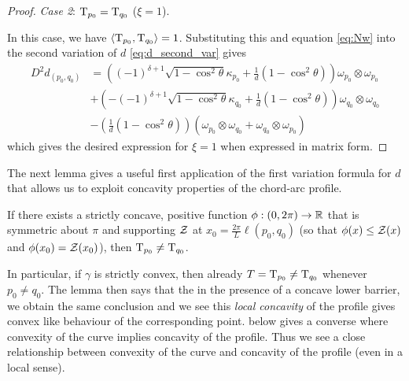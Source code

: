 \documentclass[a4paper, 12pt]{amsart}
\begin{document}
\begin{proof}
\emph{Case 2}: $\operatorname{T}_{p_0} = \operatorname{T}_{q_0}$ ($\xi = 1$).

In this case, we have $\left\langle \operatorname{T}_{p_0},\operatorname{T}_{q_0} \right\rangle = 1$. Substituting this and equation \eqref{eq:Nw} into the second variation of $d$ \eqref{eq:d_second_var} gives
\begin{align*}
D^2d_{(p_0,q_0)} &=  \left((-1)^{\delta+1} \sqrt{1-\cos^2\theta}\kappa_{p_0} + \frac{1}{d}(1 - \cos^2\theta) \right) \omega_{p_0} \otimes \omega_{p_0} \\
&+ \left(-(-1)^{\delta+1} \sqrt{1-\cos^2\theta} \kappa_{q_0} + \frac{1}{d}(1 - \cos^2\theta) \right) \omega_{q_0} \otimes \omega_{q_0} \\
&- \left(\frac{1}{d}(1 - \cos^2\theta) \right) \left(\omega_{p_0} \otimes \omega_{q_0} + \omega_{q_0} \otimes \omega_{p_0} \right)
\end{align*}
which gives the desired expression for $\xi=1$ when expressed in matrix form.

\end{proof}

The next lemma gives a useful first application of the first variation formula for $d$ that allows us to exploit concavity properties of the chord-arc profile. 

\begin{lemma}
\label{lem:concave_barrier}
If there exists a strictly concave, positive function $\phi: (0, 2\pi) \to \mathbb{R}$ that is symmetric about $\pi$ and supporting $\operatorname{\mathcal{Z}}$ at $x_0= \tfrac{2\pi}{L} \ell(p_0,q_0)$ (so that $\phi(x) \leq \operatorname{\mathcal{Z}}(x)$ and $\phi(x_0)=\operatorname{\mathcal{Z}}(x_0)$), then $\operatorname{T}_{p_0} \ne \operatorname{T}_{q_0}$.
\end{lemma}

\begin{rem}
In particular, if $\gamma$ is strictly convex, then already \(T=\operatorname{T}_{p_0} \ne \operatorname{T}_{q_0}\) whenever \(p_0 \ne q_0\). The lemma then says that the in the presence of a concave lower barrier, we obtain the same conclusion and we see this \emph{local concavity} of the profile gives convex like behaviour of the corresponding point.  below gives a converse where convexity of the curve implies concavity of the profile. Thus we see a close relationship between convexity of the curve and concavity of the profile (even in a local sense).
\end{rem}
\end{document}
